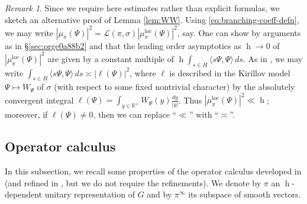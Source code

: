 \documentclass[reqno,10pt]{amsart}
\theoremstyle{plain} %
\theoremstyle{definition}
\theoremstyle{plain} %
\theoremstyle{remark}
\newtheorem*{remark*}            {Remark}
\theoremstyle{itplain} %
\theoremstyle{remark} %
\numberwithin{equation}{section}
\DeclareMathOperator{\h}{h}
\DeclareMathOperator{\loc}{loc}
\begin{document}
\begin{remark*}
  Since we require here estimates rather than explicit formulas, we sketch an alternative proof of Lemma \ref{lem:WW}.  Using \eqref{eq:branching-coeff-defn}, we may write $|\mu_\pi(\Psi)|^2 = \mathcal{L}(\pi,\sigma) |\mu_\pi^{\loc}(\Psi)|^2$, say.  One can show by arguments as in \S\ref{sec:orge0a88b2} and \cite[\S6.3]{nelson-padic-que} that the leading order asymptotics as $\h \rightarrow 0$ of $|\mu_\pi^{\loc}(\Psi)|^2$ are given by a constant multiple of $\h \int_{s \in H} \langle s \Psi, \Psi \rangle \, d s$.  As in \cite[\S3.3.1]{michel-2009}, we may write $\int_{s \in H} \langle s \Psi, \Psi \rangle \, d s \asymp |\ell(\Psi)|^2$, where $\ell$ is described in the Kirillov model $\Psi \mapsto W_{\Psi}$ of $\sigma$ (with respect to some fixed nontrivial character) by the absolutely convergent integral $\ell(\Psi) = \int_{y \in \mathbb{R}^\times} W_\Psi(y) \frac{d y}{|y|}$.  Thus $|\mu_\pi^{\loc}(\Psi)|^2 \ll \h$; moreover, if $\ell(\Psi) \neq 0$, then we can replace ``$\ll$'' with ``$\asymp$''.
\end{remark*}



\subsection{Operator calculus}\label{sec:operator-calculus}
In this subsection, we recall some properties of the operator calculus developed in \cite{nelson-venkatesh-1} (and refined in \cite{2020arXiv201202187N, PDNstandard}, but we do not require the refinements).  We denote by $\pi$ an $\h$-dependent unitary representation of $G$ and by $\pi^{\infty}$ its subspace of smooth vectors.
\end{document}
